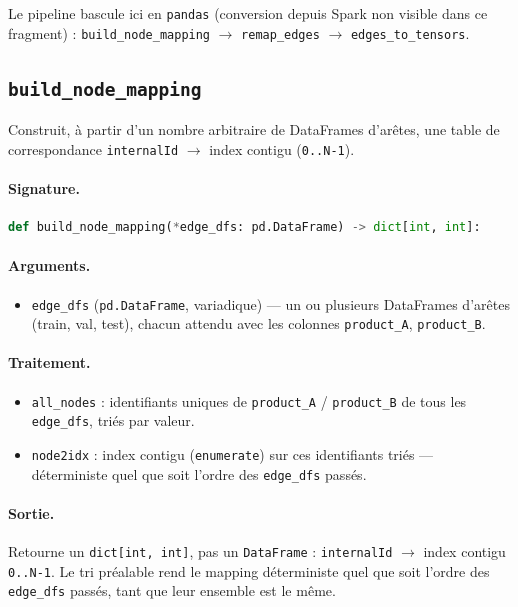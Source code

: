 \documentclass[11pt,a4paper]{article}
\newcommand{\code}[1]{\texttt{\small #1}}
\begin{document}
Le pipeline bascule ici en \code{pandas} (conversion depuis Spark non visible dans
ce fragment) : \code{build\_node\_mapping} $\to$ \code{remap\_edges} $\to$
\code{edges\_to\_tensors}.

\subsection{\texttt{build\_node\_mapping}}
\label{subsec:fn-build-node-mapping}

Construit, à partir d'un nombre arbitraire de DataFrames d'arêtes, une table de
correspondance \code{internalId} $\to$ index contigu (\code{0..N-1}).

\paragraph{Signature.}\leavevmode\par
\begin{lstlisting}[language=Python]
def build_node_mapping(*edge_dfs: pd.DataFrame) -> dict[int, int]:
\end{lstlisting}

\paragraph{Arguments.}
\begin{itemize}[nosep,leftmargin=*]
  \item \code{*edge\_dfs} (\code{pd.DataFrame}, variadique) --- un ou plusieurs
        DataFrames d'arêtes (train, val, test), chacun attendu avec les colonnes
        \code{product\_A}, \code{product\_B}.
\end{itemize}

\paragraph{Traitement.}
\begin{itemize}[nosep,leftmargin=*]
  \item \code{all\_nodes} : identifiants uniques de \code{product\_A} /
        \code{product\_B} de tous les \code{edge\_dfs}, triés par valeur.
  \item \code{node2idx} : index contigu (\code{enumerate}) sur ces
        identifiants triés --- déterministe quel que soit l'ordre des
        \code{edge\_dfs} passés.
\end{itemize}

\paragraph{Sortie.}
Retourne un \code{dict[int, int]}, pas un \code{DataFrame} : \code{internalId}
$\to$ index contigu \code{0..N-1}. Le tri préalable rend le mapping déterministe
quel que soit l'ordre des \code{edge\_dfs} passés, tant que leur ensemble est le
même.
\end{document}
